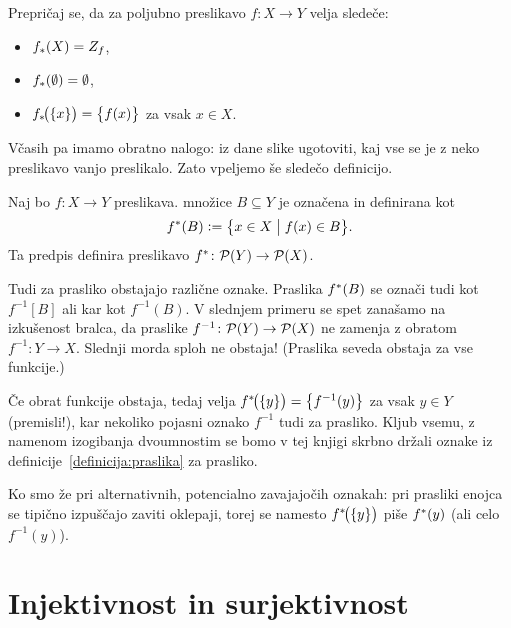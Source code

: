 \begin{vaja}
Prepričaj se, da za poljubno preslikavo $f\colon X \to Y$ velja sledeče:
\begin{itemize}
\item
$\img{f}{X} = \rn{f}$,
\item
$\img{f}{\emptyset} = \emptyset$,
\item
$\img[1]{f}{\set{x}} = \set[1]{f(x)}$ za vsak $x \in X$.
\end{itemize}
\end{vaja}


Včasih pa imamo obratno nalogo: iz dane slike ugotoviti, kaj vse se je z neko preslikavo vanjo preslikalo. Zato vpeljemo še sledečo definicijo.

\begin{definicija}\label{definicija:praslika}
Naj bo $f\colon X \to Y$ preslikava.  množice $B \subseteq Y$ je označena in definirana kot
\[\pim{f}{B} \dfeq \set[1]{x \in X}{f(x) \in B}.\]
Ta predpis definira preslikavo $\pim{f}\colon \pst(Y) \to \pst(X)$.
\end{definicija}

\begin{opomba}
Tudi za prasliko obstajajo različne oznake. Praslika $\pim{f}{B}$ se označi tudi kot $f^{-1}[B]$ ali kar kot $f^{-1}(B)$. V slednjem primeru se spet zanašamo na izkušenost bralca, da praslike $f^{-1}\colon \mathcal{P}(Y) \to \mathcal{P}(X)$ ne zamenja z obratom $f^{-1}\colon Y \to X$. Slednji morda sploh ne obstaja! (Praslika seveda obstaja za vse funkcije.)

Če obrat funkcije obstaja, tedaj velja $\pim[1]{f}{\set{y}} = \set[1]{f^{-1}(y)}$ za vsak $y \in Y$ (premisli!), kar nekoliko pojasni oznako $f^{-1}$ tudi za prasliko. Kljub vsemu, z namenom izogibanja dvoumnostim se bomo v tej knjigi skrbno držali oznake iz definicije~\ref{definicija:praslika} za prasliko.

Ko smo že pri alternativnih, potencialno zavajajočih oznakah: pri prasliki enojca se tipično izpuščajo zaviti oklepaji, torej se namesto $\pim[1]{f}{\set{y}}$ piše $\pim{f}{y}$ (ali celo $f^{-1}(y)$).
\end{opomba}




\section{Injektivnost in surjektivnost}\label{razdelek:injektivnost-in-surjektivnost}

